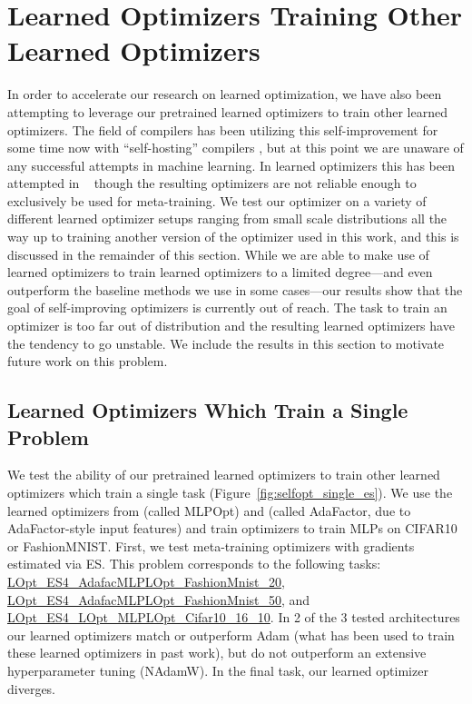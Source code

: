\documentclass[11pt]{article}
\begin{document}
\section{Learned Optimizers Training Other Learned Optimizers}
In order to accelerate our research on learned optimization, we have also been attempting to leverage our pretrained learned optimizers to train other learned optimizers.
The field of compilers has been utilizing this self-improvement for some time now with ``self-hosting'' compilers \citep{hart1962ai}, but at this point we are unaware of any successful attempts in machine learning.
In learned optimizers this has been attempted in ~\citep{metz2020tasks, metz2021training} though the resulting optimizers are not reliable enough to exclusively be used for meta-training.
We test our optimizer on a variety of different learned optimizer setups ranging from small scale distributions all the way up to training another version of the optimizer used in this work, and this is discussed in the remainder of this section. 
While we are able to make use of learned optimizers to train learned optimizers to a limited degree---and even outperform the baseline methods we use in some cases---our results show that the goal of self-improving optimizers is currently out of reach.
The task to train an optimizer is too far out of distribution and the resulting learned optimizers have the tendency to go unstable.
We include the results in this section to motivate future work on this problem. 

\subsection{Learned Optimizers Which Train a Single Problem} \label{app:learned_optimizer:single_problem}
We test the ability of our pretrained learned optimizers to train other learned optimizers which train a single task (Figure~\ref{fig:selfopt_single_es}).
We use the learned optimizers from \citet{metz2019understanding} (called MLPOpt) and \citet{metz2022practical} (called AdaFactor, due to AdaFactor-style input features) and train optimizers to train MLPs on CIFAR10 or FashionMNIST.
First, we test meta-training optimizers with gradients estimated via ES.
This problem corresponds to the following tasks: \href{https://github.com/google/learned_optimization/blob/a42b207b9ef5395fdf7e64978c26379ccba4e264/learned_optimization/tasks/fixed/lopt.py#L225}{LOpt\_ES4\_AdafacMLPLOpt\_FashionMnist\_20}, 
\href{https://github.com/google/learned_optimization/blob/a42b207b9ef5395fdf7e64978c26379ccba4e264/learned_optimization/tasks/fixed/lopt.py#L230}{LOpt\_ES4\_AdafacMLPLOpt\_FashionMnist\_50},
and \href{https://github.com/google/learned_optimization/blob/a42b207b9ef5395fdf7e64978c26379ccba4e264/learned_optimization/tasks/fixed/lopt.py#L235}{LOpt\_ES4\_LOpt\_MLPLOpt\_Cifar10\_16\_10}.
In 2 of the 3 tested architectures our learned optimizers match or outperform Adam (what has been used to train these learned optimizers in past work), but do not outperform an extensive hyperparameter tuning (NAdamW).
In the final task, our learned optimizer diverges.
\end{document}
